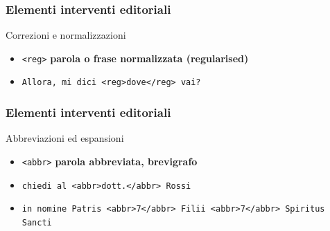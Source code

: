 \begin{frame}
    \frametitle{Elementi interventi editoriali}
    \addtocounter{nframe}{1}
    

    \begin{block}{Correzioni e normalizzazioni}
        \begin{itemize}
            \item \texttt{<reg>} \textbf{parola o frase normalizzata (regularised)}
            \item[] \texttt{Allora, mi dici <reg>dove</reg> vai?}
        \end{itemize}
        
    \end{block}
    
\end{frame}

\begin{frame}
    \frametitle{Elementi interventi editoriali}
    \addtocounter{nframe}{1}
    

    \begin{block}{Abbreviazioni ed espansioni}
        \begin{itemize}
            \item \texttt{<abbr>} \textbf{parola abbreviata, brevigrafo}
            \item[] \texttt{chiedi al <abbr>dott.</abbr> Rossi}
            \item[] \texttt{in nomine Patris <abbr>7</abbr> Filii
            <abbr>7</abbr> Spiritus Sancti}
        \end{itemize}
        
    \end{block}
    
\end{frame}

